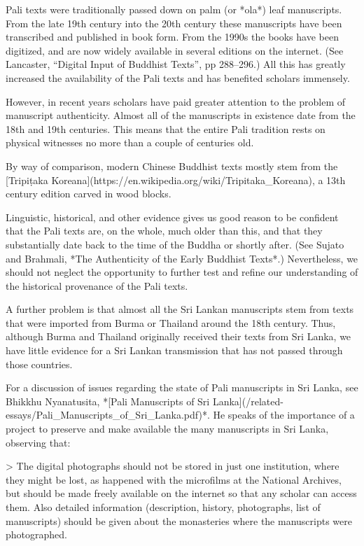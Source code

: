 \documentclass[11pt, openany,a5paper]{article}
\begin{document}
\begin{markdown}
Pali texts were traditionally passed down on palm (or *ola*) leaf manuscripts. From the late 19th century into the 20th century these manuscripts have been transcribed and published in book form. From the 1990s the books have been digitized, and are now widely available in several editions on the internet. (See Lancaster, “Digital Input of Buddhist Texts”, pp 288–296.) All this has greatly increased the availability of the Pali texts and has benefited scholars immensely.

However, in recent years scholars have paid greater attention to the problem of manuscript authenticity. Almost all of the manuscripts in existence date from the 18th and 19th centuries. This means that the entire Pali tradition rests on physical witnesses no more than a couple of centuries old.

By way of comparison, modern Chinese Buddhist texts mostly stem from the [Tripiṭaka Koreana](https://en.wikipedia.org/wiki/Tripitaka_Koreana), a 13th century edition carved in wood blocks.

Linguistic, historical, and other evidence gives us good reason to be confident that the Pali texts are, on the whole, much older than this, and that they substantially date back to the time of the Buddha or shortly after. (See Sujato and Brahmali, *The Authenticity of the Early Buddhist Texts*.) Nevertheless, we should not neglect the opportunity to further test and refine our understanding of the historical provenance of the Pali texts.

A further problem is that almost all the Sri Lankan manuscripts stem from texts that were imported from Burma or Thailand around the 18th century. Thus, although Burma and Thailand originally received their texts from Sri Lanka, we have little evidence for a Sri Lankan transmission that has not passed through those countries.

For a discussion of issues regarding the state of Pali manuscripts in Sri Lanka, see Bhikkhu Nyanatusita, *[Pali Manuscripts of Sri Lanka](/related-essays/Pali_Manuscripts_of_Sri_Lanka.pdf)*. He speaks of the importance of a project to preserve and make available the many manuscripts in Sri Lanka, observing that:

> The digital photographs should not be stored in just one institution, where they might be lost, as happened with the microfilms at the National Archives, but should be made freely available on the internet so that any scholar can access them. Also detailed information (description, history, photographs, list of manuscripts) should be given about the monasteries where the manuscripts were photographed.


\end{markdown}
\end{document}
